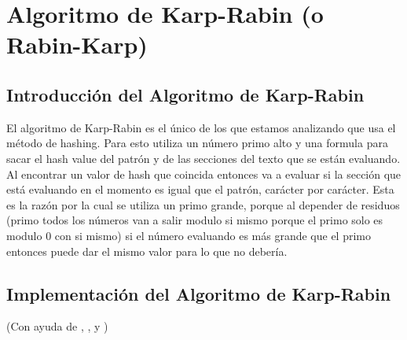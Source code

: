 \section*{Algoritmo de Karp-Rabin (o Rabin-Karp)}
{}

\subsection*{Introducción del Algoritmo de Karp-Rabin}
\quad El algoritmo de Karp-Rabin es el único de los que estamos analizando que usa el método de hashing. Para esto utiliza un número primo alto y una formula para sacar el hash value del patrón y de las secciones del texto que se están evaluando. Al encontrar un valor de hash que coincida entonces va a evaluar si la sección que está evaluando en el momento es igual que el patrón, carácter por carácter. Esta es la razón por la cual se utiliza un primo grande, porque al depender de residuos (primo todos los números van a salir modulo si mismo porque el primo solo es modulo 0 con si mismo) si el número evaluando es más grande que el primo entonces puede dar el mismo valor para lo que no debería.


\subsection*{Implementación del Algoritmo de Karp-Rabin}

(Con ayuda de \cite{Cormen_Leiserson_Rivest_Stein_2009}, \cite{HakakSaqibIqbal2019ESMA}, \cite{KRGFG} y \cite{Karp-Rabin})

